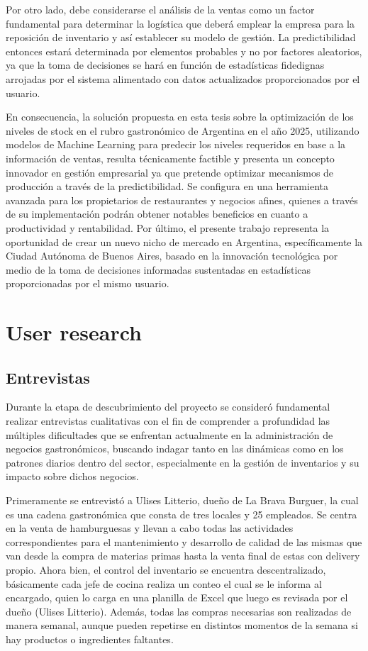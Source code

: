 Por otro lado, debe considerarse el análisis de la ventas como un factor fundamental para determinar la logística que deberá emplear la empresa para la reposición de inventario y así establecer su modelo de gestión. La predictibilidad entonces estará determinada por elementos probables y no por factores aleatorios, ya que la toma de decisiones se hará en función de estadísticas fidedignas arrojadas por el sistema alimentado con datos actualizados proporcionados por el usuario.

En consecuencia, la solución propuesta en esta tesis sobre la optimización de los niveles de stock en el rubro gastronómico de Argentina en el año 2025, utilizando modelos de Machine Learning para predecir los niveles requeridos en base a la información de ventas, resulta técnicamente factible y presenta un concepto innovador en gestión empresarial ya que pretende optimizar mecanismos de producción a través de la predictibilidad. Se configura en una herramienta avanzada para los propietarios de restaurantes y negocios afines, quienes a través de su implementación podrán obtener notables beneficios en cuanto a productividad y rentabilidad. Por último, el presente trabajo representa la oportunidad de crear un nuevo nicho de mercado en Argentina, específicamente la Ciudad Autónoma de Buenos Aires, basado en la innovación tecnológica por medio de la toma de decisiones informadas sustentadas en estadísticas proporcionadas por el mismo usuario.  


\section{User research}\label{sec:user-research}

\subsection{Entrevistas}\label{sec:entrevistas}

Durante la etapa de descubrimiento del proyecto se consideró fundamental realizar entrevistas cualitativas con el fin de comprender a profundidad las múltiples dificultades que se enfrentan actualmente en la administración de negocios gastronómicos, buscando indagar tanto en las dinámicas como en los patrones diarios dentro del sector, especialmente en la gestión de inventarios y su impacto sobre dichos negocios.

Primeramente se entrevistó a Ulises Litterio, dueño de La Brava Burguer, la cual es una cadena gastronómica que consta de tres locales y 25 empleados. Se centra en la venta de hamburguesas y llevan a cabo todas las actividades correspondientes para el mantenimiento y desarrollo de calidad de las mismas que van desde la compra de materias primas hasta la venta final de estas con delivery propio. Ahora bien, el control del inventario se encuentra descentralizado, básicamente cada jefe de cocina realiza un conteo el cual se le informa al encargado, quien lo carga en una planilla de Excel que luego es revisada por el dueño (Ulises Litterio). Además, todas las compras necesarias son realizadas de manera semanal, aunque pueden repetirse en distintos momentos de la semana si hay productos o ingredientes faltantes.

